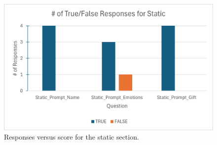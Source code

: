 \documentclass[manuscript,screen]{acmart}
\begin{document}
\begin{figure}[htbp]
  \centering
  \includegraphics[scale=0.75]{Responses vs Question for Static.png}
  \caption{Responses versus score for the static section.}
\end{figure}

\FloatBarrier
\end{document}
